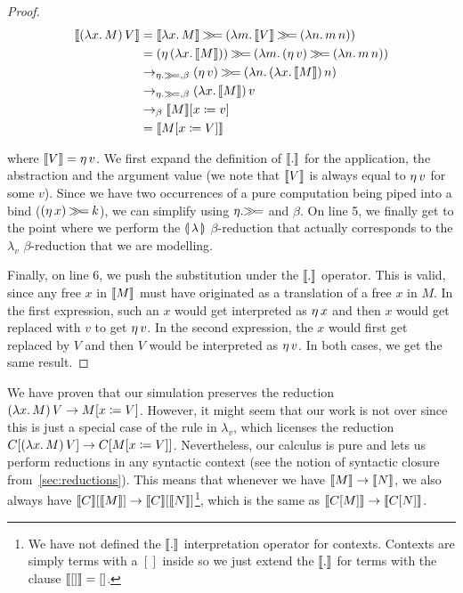 \begin{proof}

\begin{align}
  \llbracket (\lambda x.\, M)\,V \rrbracket
&= \llbracket \lambda x.\, M \rrbracket \mathbin{\gg\!=} (\lambda m.\, \llbracket V \rrbracket \mathbin{\gg\!=} (\lambda n.\, m\,n)) \\
&= (\eta\,(\lambda x.\, \llbracket M \rrbracket)) \mathbin{\gg\!=} (\lambda m.\, (\eta\,v) \mathbin{\gg\!=} (\lambda n.\, m\,n)) \\
&\to_{\eta.\mathbin{\gg\!=},\beta} (\eta\,v) \mathbin{\gg\!=} (\lambda n.\, (\lambda x.\, \llbracket M \rrbracket)\,n) \\
&\to_{\eta.\mathbin{\gg\!=},\beta} (\lambda x.\, \llbracket M \rrbracket)\,v \\
&\to_{\beta} \llbracket M \rrbracket[x \coloneqq v] \\
&= \llbracket M[x \coloneqq V] \rrbracket
\end{align}
\setcounter{equation}{0}

where $\llbracket V \rrbracket = \eta\,v$. We first expand the definition of $\llbracket . \rrbracket$
for the application, the abstraction and the argument value (we note that
$\llbracket V \rrbracket$ is always equal to $\eta\,v$ for some $v$). Since we have
two occurrences of a pure computation being piped into a bind
($(\eta\,x) \mathbin{\gg\!=} k$), we can simplify using $\eta.\mathbin{\gg\!=}$ and
$\beta$. On line 5, we finally get to the point where we perform the
$\llparenthesis \, \lambda \, \rrparenthesis$ $\beta$-reduction that actually corresponds to the
$\lambda_v$ $\beta$-reduction that we are modelling.

Finally, on line 6, we push the substitution under the $\llbracket . \rrbracket$
operator. This is valid, since any free $x$ in $\llbracket M \rrbracket$ must have
originated as a translation of a free $x$ in $M$. In the first expression,
such an $x$ would get interpreted as $\eta\,x$ and then $x$ would get
replaced with $v$ to get $\eta\,v$. In the second expression, the $x$
would first get replaced by $V$ and then $V$ would be interpreted as
$\eta\,v$. In both cases, we get the same result.

\end{proof}

We have proven that our simulation preserves the reduction
$(\lambda x.\, M)\,V \to M[x \coloneqq V]$. However, it might seem that our
work is not over since this is just a special case of the rule in
$\lambda_v$, which licenses the reduction $C[(\lambda x.\, M)\,V] \to
C[M[x \coloneqq V]]$. Nevertheless, our calculus is pure and lets us perform
reductions in any syntactic context (see the notion of syntactic closure
from~\ref{sec:reductions}). This means that whenever we have $\llbracket M \rrbracket \to
\llbracket N \rrbracket$, we also always have $\llbracket C \rrbracket[\llbracket M \rrbracket] \to
\llbracket C \rrbracket[\llbracket N \rrbracket]$\footnote{We have not defined the $\llbracket . \rrbracket$ interpretation
  operator for contexts. Contexts are simply terms with a $[]$ inside so we
  just extend the $\llbracket . \rrbracket$ for terms with the clause $\llbracket [] \rrbracket = []$.},
which is the same as $\llbracket C[M] \rrbracket \to \llbracket C[N] \rrbracket$.

